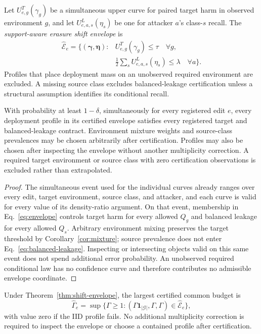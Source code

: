 Let $U^T_{e,g}(\gamma_g)$ be a simultaneous upper curve for paired target harm
in observed environment $g$, and let $U^L_{e,a,s}(\eta_s)$ be one for attacker
$a$'s class-$s$ recall. The \emph{support-aware erasure shift envelope} is
\begin{equation}
\begin{split}
 \widehat{\mathcal E}_e=\{(\boldsymbol\gamma,\boldsymbol\eta):
 &U^T_{e,g}(\gamma_g)\leq\tau\quad\forall g,\\
 &\tfrac12\textstyle\sum_s U^L_{e,a,s}(\eta_s)\leq\lambda
 \quad\forall a\}.
 \label{eq:envelope}
\end{split}
\end{equation}
Profiles that place deployment mass on an unobserved required environment are
excluded. A missing source class excludes balanced-leakage certification
unless a structural assumption identifies its conditional recall.

\begin{theorem}
\label{thm:shift-envelope}
With probability at least $1-\delta$, simultaneously for every registered edit
$e$, every deployment profile in its certified envelope satisfies every
registered target and balanced-leakage contract. Environment mixture weights
and source-class prevalences may be chosen arbitrarily after certification.
Profiles may also be chosen after inspecting the envelope without another
multiplicity correction. A required target environment or source class with
zero certification observations is excluded rather than extrapolated.
\end{theorem}

\begin{proof}
The simultaneous event used for the individual curves already ranges over
every edit, target environment, source class, and attacker, and each curve is
valid for every value of its density-ratio argument. On that event, membership
in Eq.~\eqref{eq:envelope} controls target harm for every allowed $Q_g$ and
balanced leakage for every allowed $Q_s$. Arbitrary environment mixing
preserves the target threshold by Corollary~\ref{cor:mixture}; source prevalence
does not enter Eq.~\eqref{eq:balanced-leakage}. Inspecting or intersecting
objects valid on this same event does not spend additional error probability.
An unobserved required conditional law has no confidence curve and therefore
contributes no admissible envelope coordinate.
\end{proof}

\begin{corollary}
\label{cor:common-radius}
Under Theorem~\ref{thm:shift-envelope}, the largest certified common budget is
\begin{equation}
 \widehat\Gamma_e=\sup\{\Gamma\geq1:
 (\Gamma\mathbf 1_{|\mathcal G|},\Gamma,\Gamma)
 \in\widehat{\mathcal E}_e\},
\end{equation}
with value zero if the IID profile fails. No additional multiplicity
correction is required to inspect the envelope or choose a contained profile
after certification.
\end{corollary}

